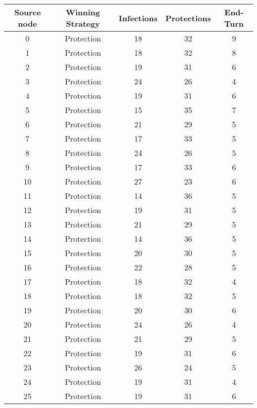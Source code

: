 \documentclass[results.tex]{subfiles}
\begin{document}
\begin{center}
  \begin{tabular}{| c || c | c | c | c |}
    \hline
    {\bfseries Source node} & {\bfseries Winning Strategy} & {\bfseries Infections} & {\bfseries Protections} & {\bfseries End-Turn} \\  %
    \hline\hline
    0 & Protection & 18 & 32 & 9 \\ 
    \hline
    1 & Protection & 18 & 32 & 8 \\ 
    \hline
    2 & Protection & 19 & 31 & 6 \\ 
    \hline
    3 & Protection & 24 & 26 & 4 \\ 
    \hline
    4 & Protection & 19 & 31 & 6 \\ 
    \hline
    5 & Protection & 15 & 35 & 7 \\ 
    \hline
    6 & Protection & 21 & 29 & 5 \\ 
    \hline
    7 & Protection & 17 & 33 & 5 \\ 
    \hline
    8 & Protection & 24 & 26 & 5 \\ 
    \hline
    9 & Protection & 17 & 33 & 6 \\ 
    \hline
    10 & Protection & 27 & 23 & 6 \\ 
    \hline
    11 & Protection & 14 & 36 & 5 \\ 
    \hline
    12 & Protection & 19 & 31 & 5 \\ 
    \hline
    13 & Protection & 21 & 29 & 5 \\ 
    \hline
    14 & Protection & 14 & 36 & 5 \\ 
    \hline
    15 & Protection & 20 & 30 & 5 \\ 
    \hline
    16 & Protection & 22 & 28 & 5 \\ 
    \hline
    17 & Protection & 18 & 32 & 4 \\ 
    \hline
    18 & Protection & 18 & 32 & 5 \\ 
    \hline
    19 & Protection & 20 & 30 & 6 \\ 
    \hline
    20 & Protection & 24 & 26 & 4 \\ 
    \hline
    21 & Protection & 21 & 29 & 5 \\ 
    \hline
    22 & Protection & 19 & 31 & 6 \\ 
    \hline
    23 & Protection & 26 & 24 & 5 \\ 
    \hline
    24 & Protection & 19 & 31 & 4 \\ 
    \hline
    25 & Protection & 19 & 31 & 6 \\ 

\end{tabular}
\end{center}
\end{document}
